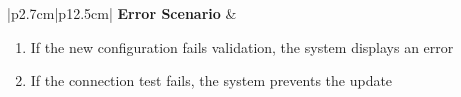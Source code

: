 \begin{table}[H]
\begin{tabular}{|p{2.7cm}|p{12.5cm}|}
        \textbf{Error Scenario} & \begin{minipage}[t]{\linewidth}
                                      \begin{enumerate}[topsep=0pt,itemsep=1pt,parsep=0pt,partopsep=0pt]
                                          \item If the new configuration fails validation, the system displays an error
                                          \item If the connection test fails, the system prevents the update
                                      \end{enumerate}
                                  \end{minipage} \\
        \hline
    \end{tabular}
    \label{tab:admin-edit-gateway}
\end{table}

